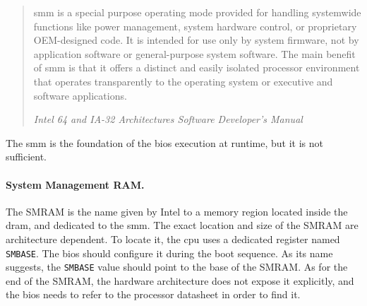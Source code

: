 
\begin{quote}
  \ac{smm} is a special purpose operating mode provided for handling systemwide
  functions like power management, system hardware control, or proprietary
  OEM-designed code.
  It is intended for use only by system firmware, not by application software or
  general-purpose system software.
  The main benefit of \ac{smm} is that it offers a distinct and easily isolated
  processor environment that operates transparently to the operating system or
  executive and software applications.

  \hfill \small \emph{Intel 64 and IA-32 Architectures Software Developer’s
    Manual}
\end{quote}

The \ac{smm} is the foundation of the \ac{bios} execution at runtime, but it is
not sufficient.

\paragraph{System Management RAM.}
%
The SMRAM is the name given by Intel to a memory region located inside the
\ac{dram}, and dedicated to the \ac{smm}.
%
The exact location and size of the SMRAM are architecture dependent.
%
To locate it, the \ac{cpu} uses a dedicated register named \texttt{SMBASE}.
%
The \ac{bios} should configure it during the boot sequence.
%
As its name suggests, the \texttt{SMBASE} value should point to the base of the
SMRAM.
%
As for the end of the SMRAM, the hardware architecture does not expose it
explicitly, and the \ac{bios} needs to refer to the processor datasheet in order
to find it.

